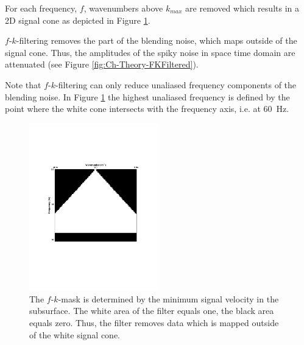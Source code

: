 For each frequency, $f$, wavenumbers above $k_{max}$ are removed which results in a 2D signal cone as depicted in Figure \ref{fig:Ch-Theory-FK-Mask}.


$f$-$k$-filtering removes the part of the blending noise, which maps outside of the signal cone. Thus, the amplitudes of the spiky noise in space time domain are attenuated (see Figure \ref{fig:Ch-Theory-FKFiltered}). 

Note that $f$-$k$-filtering can only reduce unaliased frequency components of the blending noise. In Figure \ref{fig:Ch-Theory-FK-Mask} the highest unaliased frequency is defined by the point where the white cone intersects with the frequency axis, i.e. at \SI{60}{\hertz}.

\begin{figure}
	\centering
	\includegraphics[width = 0.5\textwidth]{Plots/Mahdad/5iter/FK-MaskCRG_rec30}
	\caption{The $f$-$k$-mask is determined by the minimum signal velocity in the subsurface. The white area of the filter equals one, the black area equals zero. Thus, the filter removes data which is mapped outside of the white signal cone.}
	\label{fig:Ch-Theory-FK-Mask}
\end{figure}

 


